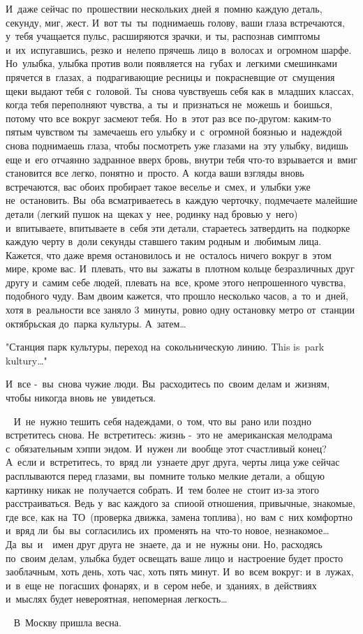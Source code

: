 И~даже сейчас по~прошествии нескольких дней я~помню каждую деталь, секунду, миг, жест.
И~вот ты~ты~поднимаешь голову, ваши глаза встречаются, у~тебя учащается пульс, расширяются зрачки, и~ты, распознав симптомы и~их~испугавшись, резко и~нелепо прячешь лицо в~волосах и~огромном шарфе.
Но~улыбка, улыбка против воли появляется на~губах и~легкими смешинками прячется в~глазах, а~подрагивающие ресницы и~покрасневщие от~смущения щеки выдают тебя с~головой.
Ты~снова чувствуешь себя как в~младших классах, когда тебя переполняют чувства, а~ты~и~признаться не~можешь и~боишься, потому что все вокруг засмеют тебя.
Но~в~этот раз все по-другом: каким-то пятым чувством ты~замечаешь его улыбку и~с~огромной боязнью и~надеждой снова поднимаешь глаза, чтобы посмотреть уже глазами на~эту улыбку, видишь еще и~его отчаянно задранное вверх бровь, внутри тебя что-то взрывается и~вмиг становится все легко, понятно и~просто.
А~когда ваши взгляды вновь встречаются, вас обоих пробирает такое веселье и~смех, и~улыбки уже не~остановить.
Вы~оба всматриваетесь в~каждую черточку, подмечаете малейшие детали (легкий пушок на~щеках у~нее, родинку над бровью у~него) и~впитываете, впитываете в~себя эти детали, стараетесь затвердить на~подкорке каждую черту в~доли секунды ставшего таким родным и~любимым лица.
Кажется, что даже время остановилось и~не~осталось ничего вокруг в~этом мире, кроме вас.
И~плевать, что вы~зажаты в~плотном кольце безразличных друг другу и~самим себе людей, плевать на~все, кроме этого непрошенного чувства, подобного чуду.
Вам двоим кажется, что прошло несколько часов, а~то~и~дней, хотя в~реальности все заняло 3~минуты, ровно одну остановку метро от~станции октябрьская до~парка культуры.
А~затем…
 
"Станция парк культуры, переход на~сокольническую линию.
This is~park kultury…"
 
И~все -~вы~снова чужие люди.
Вы~расходитесь по~своим делам и~жизням, чтобы никогда вновь не~увидеться.

~
И~не~нужно тешить себя надеждами, о~том, что вы~рано или поздно встретитесь снова.
Не~встретитесь: жизнь -~это не~американская мелодрама с~обязательным хэппи эндом.
И~нужен ли~вообще этот счастливый конец? А~если и~встретитесь, то~вряд ли~узнаете друг друга, черты лица уже сейчас расплываются перед глазами, вы~помните только мелкие детали, а~общую картинку никак не~получается собрать.
И~тем более не~стоит из-за этого расстраиваться.
Ведь у~вас каждого за~спиоой отношения, привычные, знакомые, где все, как на~ТО~(проверка движка, замена топлива), но~вам с~них комфортно и~вряд ли~бы~вы~согласились их~променять на~что-то новое, незнакомое… 
~
Да~вы~и~~имен друг друга не~знаете, да~и~не~нужны они.
Но, расходясь по~своим делам, улыбка будет освещать ваше лицо и~настроение будет просто заоблачным, хоть день, хоть час, хоть пять минут.
И~во~всем вокруг: и~в~лужах, и~в~еще не~погасших фонарях, и~в~сером небе, и~зданиях, в~действиях и~мыслях будет невероятная, непомерная легкость…
 

~
В~Москву пришла весна.
 

~
